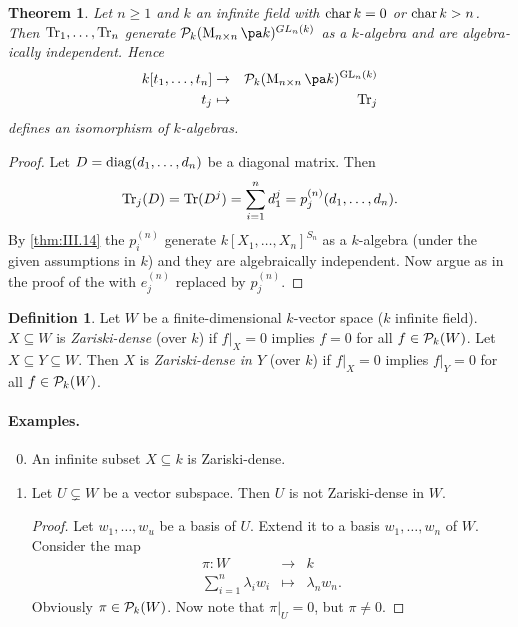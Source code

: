 \documentclass[12pt,a4paper]{scrartcl}
\theoremstyle{cplain}
\theoremstyle{cplain}
\newtheorem{thm}[thmcounter]{Theorem}
\theoremstyle{cplain}
\theoremstyle{definition}
\newtheorem*{deff}{Definition}
\begin{document}
\begin{otherlanguage}{english}
\begin{thm}
  Let $n\ge 1$ and $k$ an infinite field with $\operatorname{char} k = 0$ or $\operatorname{char} k > n$. Then $\operatorname{Tr}_1,\ldots,\operatorname{Tr}_n$ generate $\Ps_k(\Mat nk)^{GL_n(k)}$ as a $k$-algebra and are algebraically independent. Hence
  \begin{eqnarray*}
    k[t_1,\ldots,t_n] &\to& \Ps_k(\Mat nk)^{\GL_n(k)} \\
    t_j &\mapsto& \Tr_j
  \end{eqnarray*}
  defines an isomorphism of $k$-algebras.
\end{thm}
\begin{proof}
  Let $D = \operatorname{diag}(d_1,\ldots,d_n)$ be a diagonal matrix. Then \[\operatorname{Tr}_j(D) = \operatorname{Tr}(D^j) = \sum_{i=1}^nd_1^j = p_j^{(n)}(d_1,\ldots,d_n).\] By \cref{thm:III.14} the $p_i^{(n)}$ generate $k[X_1,\ldots,X_n]^{S_n}$ as a $k$-algebra (under the given assumptions in $k$) and they are algebraically independent. Now argue as in the proof of the  with $e_j^{(n)}$ replaced by $p_j^{(n)}$.
\end{proof}

\begin{deff}
  Let $W$ be a finite-dimensional $k$-vector space ($k$ infinite field). $X \subseteq W$ is \emph{Zariski-dense} (over $k$) if $f|_X = 0$ implies $f = 0$ for all $f\in \mathcal{P}_k(W)$. Let $X \subseteq Y \subseteq W$. Then $X$ is \emph{Zariski-dense in $Y$} (over $k$) if $f|_X = 0$ implies $f|_Y = 0$ for all $f\in \mathcal{P}_k(W)$.
\end{deff}

\paragraph{Examples.}
\begin{enumerate}
 \setcounter{enumi}{-1}
 \item An infinite subset $X \subseteq k$ is Zariski-dense.
 \item Let $U \subsetneq W$ be a vector subspace. Then $U$ is not Zariski-dense in $W$.
 \begin{proof}
    Let $w_1,\ldots,w_u$ be a basis of $U$. Extend it to a basis $w_1,\ldots,w_n$ of $W$. Consider the map
    \begin{eqnarray*}
      \pi\colon W &\to& k \\
      \sum_{i=1}^n\lambda_iw_i &\mapsto& \lambda_nw_n.
    \end{eqnarray*}
    Obviously $\pi\in\mathcal{P}_k(W)$. Now note that $\pi|_U = 0$, but $\pi\neq 0$.
 \end{proof}
\end{enumerate}


\end{otherlanguage}
\end{document}

